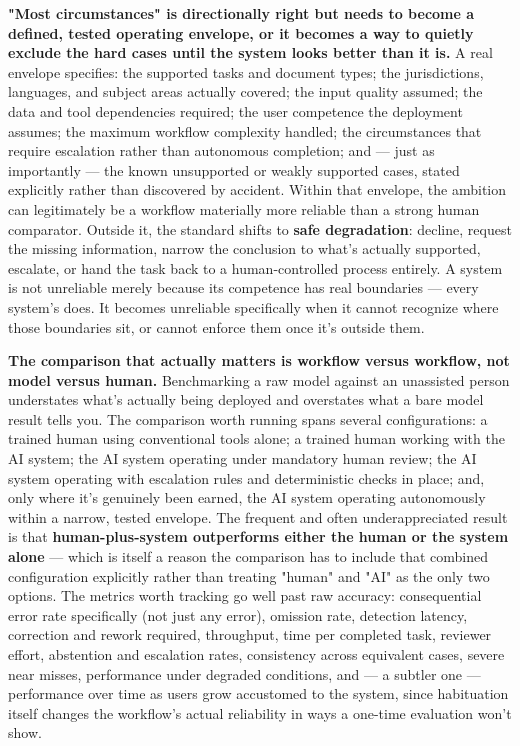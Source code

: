 \textbf{"Most circumstances" is directionally right but needs to become a defined, tested operating envelope, or it becomes a way to quietly exclude the hard cases until the system looks better than it is.} A real envelope specifies: the supported tasks and document types; the jurisdictions, languages, and subject areas actually covered; the input quality assumed; the data and tool dependencies required; the user competence the deployment assumes; the maximum workflow complexity handled; the circumstances that require escalation rather than autonomous completion; and --- just as importantly --- the known unsupported or weakly supported cases, stated explicitly rather than discovered by accident. Within that envelope, the ambition can legitimately be a workflow materially more reliable than a strong human comparator. Outside it, the standard shifts to \textbf{safe degradation}: decline, request the missing information, narrow the conclusion to what's actually supported, escalate, or hand the task back to a human-controlled process entirely. A system is not unreliable merely because its competence has real boundaries --- every system's does. It becomes unreliable specifically when it cannot recognize where those boundaries sit, or cannot enforce them once it's outside them.

\textbf{The comparison that actually matters is workflow versus workflow, not model versus human.} Benchmarking a raw model against an unassisted person understates what's actually being deployed and overstates what a bare model result tells you. The comparison worth running spans several configurations: a trained human using conventional tools alone; a trained human working with the AI system; the AI system operating under mandatory human review; the AI system operating with escalation rules and deterministic checks in place; and, only where it's genuinely been earned, the AI system operating autonomously within a narrow, tested envelope. The frequent and often underappreciated result is that \textbf{human-plus-system outperforms either the human or the system alone} --- which is itself a reason the comparison has to include that combined configuration explicitly rather than treating "human" and "AI" as the only two options. The metrics worth tracking go well past raw accuracy: consequential error rate specifically (not just any error), omission rate, detection latency, correction and rework required, throughput, time per completed task, reviewer effort, abstention and escalation rates, consistency across equivalent cases, severe near misses, performance under degraded conditions, and --- a subtler one --- performance over time as users grow accustomed to the system, since habituation itself changes the workflow's actual reliability in ways a one-time evaluation won't show.

